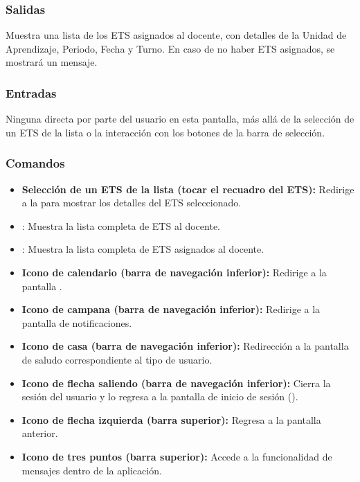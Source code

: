 \subsubsection{Salidas}
Muestra una lista de los ETS asignados al docente, con detalles de la Unidad de Aprendizaje, Periodo, Fecha y Turno. En caso de no haber ETS asignados, se mostrará un mensaje.

\subsubsection{Entradas}
Ninguna directa por parte del usuario en esta pantalla, más allá de la selección de un ETS de la lista o la interacción con los botones de la barra de selección.

\subsubsection{Comandos}
\begin{itemize}
	\item \textbf{Selección de un ETS de la lista (tocar el recuadro del ETS):} Redirige a la  para mostrar los detalles del ETS seleccionado.
	\item {}: Muestra la lista completa de ETS al docente.
	\item {}:  Muestra la lista completa de ETS asignados al docente.
	\item \textbf{Icono de calendario (barra de navegación inferior):} Redirige a la pantalla .
	\item \textbf{Icono de campana (barra de navegación inferior):} Redirige a la pantalla de notificaciones.
	\item \textbf{Icono de casa (barra de navegación inferior):} Redirección a la pantalla de saludo correspondiente al tipo de usuario.
	\item \textbf{Icono de flecha saliendo (barra de navegación inferior):} Cierra la sesión del usuario y lo regresa a la pantalla de inicio de sesión ().
	\item \textbf{Icono de flecha izquierda (barra superior):} Regresa a la pantalla anterior.
	\item \textbf{Icono de tres puntos (barra superior):} Accede a la funcionalidad de mensajes dentro de la aplicación.
\end{itemize}

